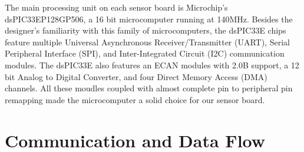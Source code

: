 The main processing unit on each sensor board is Microchip's dsPIC33EP128GP506, a 16 bit microcomputer running at 140MHz. 
Besides the designer's familiarity with this family of microcomputers, the dsPIC33E chips feature multiple Universal Asynchronous Receiver/Transmitter (UART), Serial Peripheral Interface (SPI), and Inter-Integrated Circuit (I2C) communication modules. 
The dsPIC33E also features an ECAN modules with 2.0B support, a 12 bit Analog to Digital Converter, and four Direct Memory Access (DMA) channels. 
All these moudles coupled with almost complete pin to peripheral pin remapping made the microcomputer a solid choice for our sensor board. 

\section{Communication and Data Flow}



